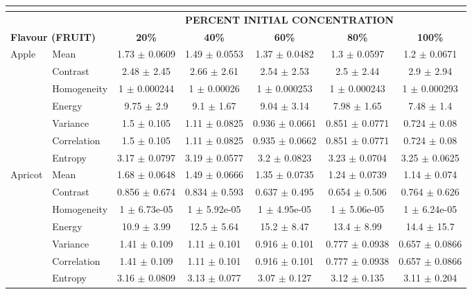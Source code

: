 \documentclass[authoryear]{elsarticle}
\begin{document}
\begin{tabular}{llccccc}
	\multicolumn{7}{c}{}\\ 
	\toprule
    \multicolumn{1}{r}{} & & \multicolumn{5}{c}{\textbf{PERCENT INITIAL CONCENTRATION}} \\
    \midrule
    \multicolumn{2}{l}{\textbf{Flavour (FRUIT)}} & \textbf{20\%} & \textbf{40\%} & \textbf{60\%} & \textbf{80\%} & \textbf{100\%} \\
    \midrule
Apple & Mean & 1.73 $\pm$ 0.0609 & 1.49 $\pm$ 0.0553 & 1.37 $\pm$ 0.0482 & 1.3 $\pm$ 0.0597 & 1.2 $\pm$ 0.0671 \\ 
& Contrast & 2.48 $\pm$ 2.45 & 2.66 $\pm$ 2.61 & 2.54 $\pm$ 2.53 & 2.5 $\pm$ 2.44 & 2.9 $\pm$ 2.94 \\ 
& Homogeneity & 1 $\pm$ 0.000244 & 1 $\pm$ 0.00026 & 1 $\pm$ 0.000253 & 1 $\pm$ 0.000243 & 1 $\pm$ 0.000293 \\ 
& Energy & 9.75 $\pm$ 2.9 & 9.1 $\pm$ 1.67 & 9.04 $\pm$ 3.14 & 7.98 $\pm$ 1.65 & 7.48 $\pm$ 1.4 \\ 
& Variance & 1.5 $\pm$ 0.105 & 1.11 $\pm$ 0.0825 & 0.936 $\pm$ 0.0661 & 0.851 $\pm$ 0.0771 & 0.724 $\pm$ 0.08 \\ 
& Correlation & 1.5 $\pm$ 0.105 & 1.11 $\pm$ 0.0825 & 0.935 $\pm$ 0.0662 & 0.851 $\pm$ 0.0771 & 0.724 $\pm$ 0.08 \\ 
& Entropy & 3.17 $\pm$ 0.0797 & 3.19 $\pm$ 0.0577 & 3.2 $\pm$ 0.0823 & 3.23 $\pm$ 0.0704 & 3.25 $\pm$ 0.0625 \\ 
    \midrule   
Apricot & Mean & 1.68 $\pm$ 0.0648 & 1.49 $\pm$ 0.0666 & 1.35 $\pm$ 0.0735 & 1.24 $\pm$ 0.0739 & 1.14 $\pm$ 0.074 \\ 
& Contrast & 0.856 $\pm$ 0.674 & 0.834 $\pm$ 0.593 & 0.637 $\pm$ 0.495 & 0.654 $\pm$ 0.506 & 0.764 $\pm$ 0.626 \\ 
& Homogeneity & 1 $\pm$ 6.73e-05 & 1 $\pm$ 5.92e-05 & 1 $\pm$ 4.95e-05 & 1 $\pm$ 5.06e-05 & 1 $\pm$ 6.24e-05 \\ 
& Energy & 10.9 $\pm$ 3.99 & 12.5 $\pm$ 5.64 & 15.2 $\pm$ 8.47 & 13.4 $\pm$ 8.99 & 14.4 $\pm$ 15.7 \\ 
& Variance & 1.41 $\pm$ 0.109 & 1.11 $\pm$ 0.101 & 0.916 $\pm$ 0.101 & 0.777 $\pm$ 0.0938 & 0.657 $\pm$ 0.0866 \\ 
& Correlation & 1.41 $\pm$ 0.109 & 1.11 $\pm$ 0.101 & 0.916 $\pm$ 0.101 & 0.777 $\pm$ 0.0938 & 0.657 $\pm$ 0.0866 \\ 
& Entropy & 3.16 $\pm$ 0.0809 & 3.13 $\pm$ 0.077 & 3.07 $\pm$ 0.127 & 3.12 $\pm$ 0.135 & 3.11 $\pm$ 0.204 \\ 

\end{tabular}
\end{document}
